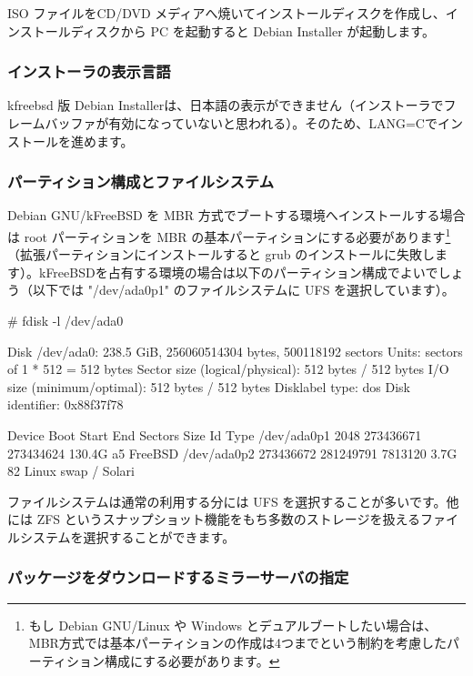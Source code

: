 \documentclass[mingoth,a4paper]{jsarticle}
\begin{document}
ISO ファイルをCD/DVD メディアへ焼いてインストールディスクを作成し、インストールディスクから PC を起動すると Debian Installer が起動します。


\subsubsection{インストーラの表示言語}

kfreebsd 版 Debian Installerは、日本語の表示ができません（インストーラでフレームバッファが有効になっていないと思われる）。そのため、LANG=Cでインストールを進めます。


\subsubsection{パーティション構成とファイルシステム}

Debian GNU/kFreeBSD を MBR 方式でブートする環境へインストールする場合は root パーティションを MBR の基本パーティションにする必要があります\footnote{もし Debian GNU/Linux や Windows とデュアルブートしたい場合は、MBR方式では基本パーティションの作成は4つまでという制約を考慮したパーティション構成にする必要があります。}（拡張パーティションにインストールすると grub のインストールに失敗します）。kFreeBSDを占有する環境の場合は以下のパーティション構成でよいでしょう（以下では "/dev/ada0p1" のファイルシステムに UFS を選択しています）。

\begin{commandline}
# fdisk -l /dev/ada0

Disk /dev/ada0: 238.5 GiB, 256060514304 bytes, 500118192 sectors
Units: sectors of 1 * 512 = 512 bytes
Sector size (logical/physical): 512 bytes / 512 bytes
I/O size (minimum/optimal): 512 bytes / 512 bytes
Disklabel type: dos
Disk identifier: 0x88f37f78

Device      Boot     Start       End   Sectors   Size Id Type
/dev/ada0p1           2048 273436671 273434624 130.4G a5 FreeBSD
/dev/ada0p2      273436672 281249791   7813120   3.7G 82 Linux swap / Solari
\end{commandline}

ファイルシステムは通常の利用する分には UFS を選択することが多いです。他には ZFS というスナップショット機能をもち多数のストレージを扱えるファイルシステムを選択することができます。


\subsubsection{パッケージをダウンロードするミラーサーバの指定}
\end{document}
